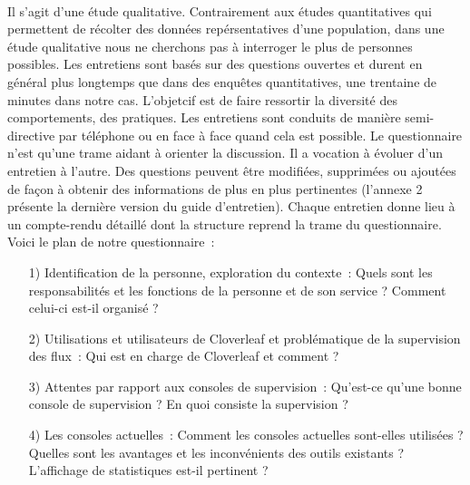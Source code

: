 			\paragraph{}%
			Il s'agit d'une étude qualitative. Contrairement aux études quantitatives qui
			permettent de récolter des données repérsentatives d'une population, dans une
			étude qualitative nous ne cherchons pas à interroger le plus de personnes
			possibles. Les entretiens sont basés sur des questions ouvertes et durent en
			général plus longtemps que dans des enquêtes quantitatives, une trentaine de
			minutes dans notre cas.
			L'objetcif est de faire ressortir la diversité des comportements, des
			pratiques.\newline
			Les entretiens sont conduits de manière semi-directive par téléphone ou en
			face à face quand cela est possible.
			Le questionnaire n'est qu'une trame aidant à orienter la discussion. Il a
			vocation à évoluer d’un entretien à l'autre. Des questions peuvent être
			modifiées, supprimées ou ajoutées de façon à obtenir des informations de plus en
			plus pertinentes (l'annexe 2 présente la dernière version du guide d'entretien).
			Chaque entretien donne lieu à un compte-rendu détaillé dont la structure reprend
			la trame du
			questionnaire.\newline
			Voici le plan de notre questionnaire~:
			\begin{itemize}
			  \item[1) Identification de la personne, exploration du contexte~:] Quels
			  sont les responsabilités et les fonctions de la personne et de son service
			  ? Comment celui-ci est-il organisé ?
			  \item[2) Utilisations et utilisateurs de Cloverleaf et problématique de la
			  supervision des flux~:] Qui est en charge de Cloverleaf et comment ?
			  \item[3) Attentes par rapport aux consoles de supervision~:] Qu'est-ce
			  qu'une bonne console de supervision ? En quoi consiste la supervision ?
			  \item[4) Les consoles actuelles~:] Comment les consoles actuelles
			  sont-elles utilisées ? Quelles sont les avantages et les inconvénients des
			  outils existants ? L'affichage de statistiques est-il pertinent ?
			\end{itemize}
			
